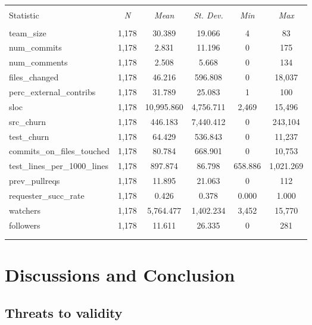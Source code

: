 \documentclass{sig-alternate}
\begin{document}
\begin{table}[htb] \centering 
  \caption{} 
\footnotesize 

\begin{tabular}{@{\extracolsep{5pt}}l c c c c c } 
\\[-1.8ex]\hline 
\hline \\[-1.8ex] 
Statistic & \multicolumn{1}{c}{\textit{N}} & \multicolumn{1}{c}{\textit{Mean}} & \multicolumn{1}{c}{\textit{St. Dev.}} & \multicolumn{1}{c}{\textit{Min}} & \multicolumn{1}{c}{\textit{Max}} \\ 
\hline \\[-1.8ex] 
team\_size & 1,178 & 30.389 & 19.066 & 4 & 83 \\ 
num\_commits & 1,178 & 2.831 & 11.196 & 0 & 175 \\ 
num\_comments & 1,178 & 2.508 & 5.668 & 0 & 134 \\ 
files\_changed & 1,178 & 46.216 & 596.808 & 0 & 18,037 \\ 
perc\_external\_contribs & 1,178 & 31.789 & 25.083 & 1 & 100 \\ 
sloc & 1,178 & 10,995.860 & 4,756.711 & 2,469 & 15,496 \\ 
src\_churn & 1,178 & 446.183 & 7,440.412 & 0 & 243,104 \\ 
test\_churn & 1,178 & 64.429 & 536.843 & 0 & 11,237 \\ 
commits\_on\_files\_touched & 1,178 & 80.784 & 668.901 & 0 & 10,753 \\ 
test\_lines\_per\_1000\_lines & 1,178 & 897.874 & 86.798 & 658.886 & 1,021.269 \\ 
prev\_pullreqs & 1,178 & 11.895 & 21.063 & 0 & 112 \\ 
requester\_succ\_rate & 1,178 & 0.426 & 0.378 & 0.000 & 1.000 \\ 
watchers & 1,178 & 5,764.477 & 1,402.234 & 3,452 & 15,770 \\ 
followers & 1,178 & 11.611 & 26.335 & 0 & 281 \\ 
\hline \\[-1.8ex] 
\normalsize 
\end{tabular} 
\end{table}

\section{Discussions and Conclusion}



\subsection{Threats to validity}
\end{document}
